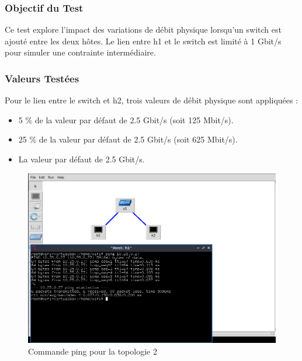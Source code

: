 
\vspace{0.5cm}
\subsubsection{Objectif du Test}
Ce test explore l'impact des variations de débit physique lorsqu'un switch est ajouté entre les deux hôtes. Le lien entre h1 et le switch est limité à 1 Gbit/s pour simuler une contrainte intermédiaire.

\subsubsection{Valeurs Testées}
Pour le lien entre le switch et h2, trois valeurs de débit physique sont appliquées :
\begin{itemize}
    \item 5 \% de la valeur par défaut de 2.5 Gbit/s (soit 125 Mbit/s).
    \item 25 \% de la valeur par défaut de 2.5 Gbit/s (soit 625 Mbit/s).
    \item La valeur par défaut de 2.5 Gbit/s.
\end{itemize}
\begin{figure}[h]
    \centering
    \includegraphics[width=1\textwidth]{./images/T1.2TopologyAndPing.png}
    \caption{Commande ping pour la topologie 2}
    \label{fig:exemple}
\end{figure}

